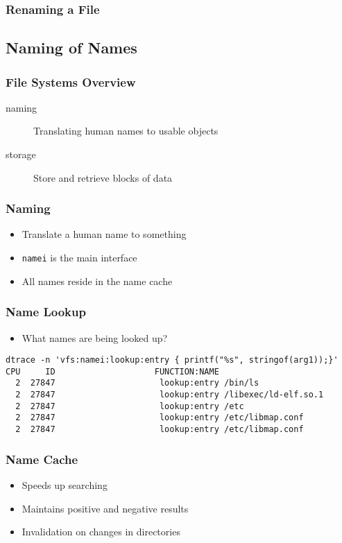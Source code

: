 \documentclass[pdftex]{beamer} %
\begin{document}
\begin{frame}
  \frametitle{Renaming a File}
  
\end{frame}

\subsection{Naming of Names}
\label{sec:naming}

\begin{frame}
  \frametitle{File Systems Overview}
  \begin{description}
  \item[naming] Translating human names to usable objects
  \item[storage] Store and retrieve blocks of data
  \end{description}
\end{frame}

\begin{frame}[fragile]
  \frametitle{Naming}
  \begin{itemize}
  \item Translate a human name to something
  \item \verb+namei+ is the main interface
  \item All names reside in the name cache
  \end{itemize}
\end{frame}

\begin{frame}[fragile]
  \frametitle{Name Lookup}
  \begin{itemize}
  \item What names are being looked up?
  \end{itemize}
\begin{lstlisting}
dtrace -n 'vfs:namei:lookup:entry { printf("%s", stringof(arg1));}'
CPU     ID                    FUNCTION:NAME
  2  27847                     lookup:entry /bin/ls
  2  27847                     lookup:entry /libexec/ld-elf.so.1
  2  27847                     lookup:entry /etc
  2  27847                     lookup:entry /etc/libmap.conf
  2  27847                     lookup:entry /etc/libmap.conf
\end{lstlisting}
\end{frame}

\begin{frame}
  \frametitle{Name Cache}
  \begin{itemize}
  \item Speeds up searching
  \item Maintains positive and negative results
  \item Invalidation on changes in directories
  \end{itemize}
\end{frame}
\end{document}
